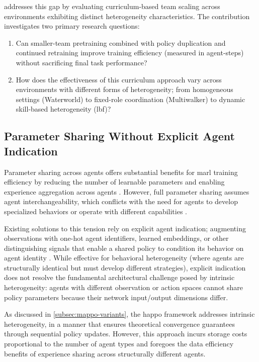 \textbf{} addresses this gap by evaluating curriculum-based 
team scaling across environments exhibiting distinct heterogeneity characteristics. 
The contribution investigates two primary research questions:

\begin{enumerate}[label=\textbf{RQ1.\arabic*:}, leftmargin=2.5cm]
    \item Can smaller-team pretraining combined with policy duplication and 
    continued retraining improve training efficiency (measured in agent-steps) 
    without sacrificing final task performance?
    \item How does the effectiveness of this curriculum approach vary across 
    environments with different forms of heterogeneity;
    from homogeneous settings (Waterworld) to fixed-role coordination (Multiwalker) 
    to dynamic skill-based heterogeneity (\gls{lbf})?
\end{enumerate}

\subsection{Parameter Sharing Without Explicit Agent Indication}
\label{sec:gap2}

Parameter sharing across agents offers substantial benefits for \gls{marl} 
training efficiency by reducing the number of learnable parameters and 
enabling experience aggregation across agents \cite{christianos2021}. 
However, full parameter sharing assumes agent interchangeability, 
which conflicts with the need for agents to develop specialized 
behaviors or operate with different capabilities \cite{terry2020}.

Existing solutions to this tension rely on explicit agent indication;
augmenting observations with one-hot agent identifiers, learned embeddings, 
or other distinguishing signals that enable a shared policy to condition 
its behavior on agent identity \cite{terry2020, iqbal2019}. 
While effective for behavioral heterogeneity (where agents are structurally 
identical but must develop different strategies), explicit indication does 
not resolve the fundamental architectural challenge posed by intrinsic heterogeneity: 
agents with different observation or action spaces cannot share policy parameters 
because their network input/output dimensions differ.

As discussed in \cref{subsec:mappo-variants}, the \gls{happo} 
framework \cite{zhong2024} addresses intrinsic heterogeneity, 
in a manner that ensures theoretical convergence guarantees 
through sequential policy updates. However, this approach 
incurs storage costs proportional to the number of agent 
types and foregoes the data efficiency benefits of experience 
sharing across structurally different agents.


